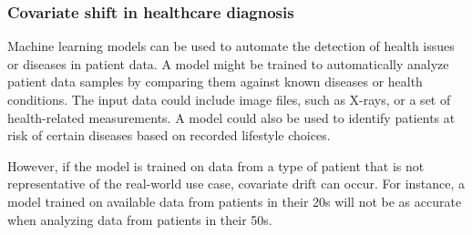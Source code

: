 \subsubsection{Covariate shift in healthcare diagnosis}
Machine learning models can be used to automate the detection of health issues or diseases in patient data. A model might be trained to automatically analyze patient data samples by comparing them against known diseases or health conditions. The input data could include image files, such as X-rays, or a set of health-related measurements. A model could also be used to identify patients at risk of certain diseases based on recorded lifestyle choices.

However, if the model is trained on data from a type of patient that is not representative of the real-world use case, covariate drift can occur. For instance, a model trained on available data from patients in their 20s will not be as accurate when analyzing data from patients in their 50s.

